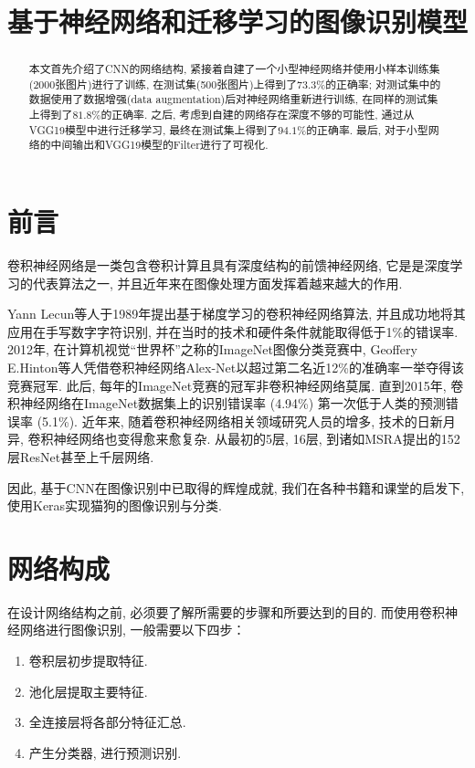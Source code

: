 \documentclass[lang=cn,11pt]{elegantpaper}
\title{基于神经网络和迁移学习的图像识别模型}
\date{}
\begin{document}

\newpage
\newpage
\begin{abstract}
	本文首先介绍了CNN的网络结构, 紧接着自建了一个小型神经网络并使用小样本训练集(2000张图片)进行了训练, 在测试集(500张图片)上得到了$73.3\%$的正确率; 对测试集中的数据使用了数据增强(data augmentation)后对神经网络重新进行训练, 在同样的测试集上得到了$81.8\%$的正确率. 之后, 考虑到自建的网络存在深度不够的可能性, 通过从VGG19模型中进行迁移学习, 最终在测试集上得到了$94.1\%$的正确率. 最后, 对于小型网络的中间输出和VGG19模型的Filter进行了可视化. 
\end{abstract}
	
\tableofcontents
\thispagestyle{empty}
\newpage
\normalsize
{}






\section{前言}
卷积神经网络是一类包含卷积计算且具有深度结构的前馈神经网络, 它是是深度学习的代表算法之一, 并且近年来在图像处理方面发挥着越来越大的作用. 

Yann Lecun等人于1989年提出基于梯度学习的卷积神经网络算法, 并且成功地将其应用在手写数字字符识别, 并在当时的技术和硬件条件就能取得低于1\%的错误率. 2012年, 在计算机视觉“世界杯”之称的ImageNet图像分类竞赛中, Geoffery E.Hinton等人凭借卷积神经网络Alex-Net以超过第二名近12\%的准确率一举夺得该竞赛冠军. 此后, 每年的ImageNet竞赛的冠军非卷积神经网络莫属. 直到2015年, 卷积神经网络在ImageNet数据集上的识别错误率 (4.94\%) 第一次低于人类的预测错误率 (5.1\%). 近年来, 随着卷积神经网络相关领域研究人员的增多, 技术的日新月异, 卷积神经网络也变得愈来愈复杂. 从最初的5层, 16层, 到诸如MSRA提出的152层ResNet甚至上千层网络. 

因此, 基于CNN在图像识别中已取得的辉煌成就, 我们在各种书籍和课堂的启发下, 使用Keras实现猫狗的图像识别与分类. 


\section{网络构成}
在设计网络结构之前, 必须要了解所需要的步骤和所要达到的目的. 而使用卷积神经网络进行图像识别, 一般需要以下四步：

\begin{enumerate}
	\item 卷积层初步提取特征.
	\item 池化层提取主要特征.
	\item 全连接层将各部分特征汇总.
	\item 产生分类器, 进行预测识别.
\end{enumerate}
\end{document}
